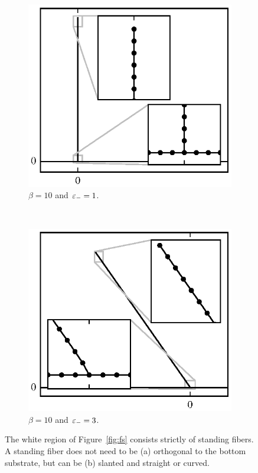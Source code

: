 {	%
	\begin{figure}[t!]
		\centering
		\begin{subfigure}{.5\textwidth}
			\centering
			\includegraphics{./fig/ch3/fs/b10_eb1.eps}
			\caption{$\beta=10$ and $\varepsilon_-=1$.\label{subfig:erect}}
		\end{subfigure}%
		~
		\begin{subfigure}{.5\textwidth}
			\centering
			\includegraphics{./fig/ch3/fs/b10_eb3.eps}
			\caption{$\beta=10$ and $\varepsilon_-=3$.\label{subfig:leaning}}
		\end{subfigure}
		\caption{The white region of Figure~\ref{fig:fs} consists strictly of standing fibers. A standing fiber does not need to be (a) orthogonal to the bottom substrate, but can be (b) slanted and straight or curved.\label{fig:alert}}
	\end{figure}

}
